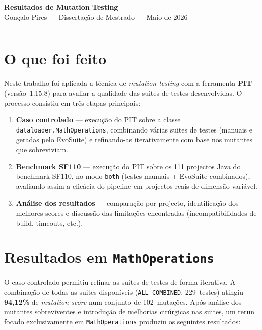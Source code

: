 \documentclass[12pt,a4paper]{article}
\begin{document}

\begin{center}
  {\LARGE\bfseries Resultados de Mutation Testing}\\[0.5em]
  {\large Gonçalo Pires --- Dissertação de Mestrado --- Maio de 2026}
\end{center}

\bigskip
\hrule
\bigskip

\section{O que foi feito}

Neste trabalho foi aplicada a técnica de \textit{mutation testing} com a ferramenta \textbf{PIT}
(versão~1.15.8) para avaliar a qualidade das suites de testes desenvolvidas.
O processo consistiu em três etapas principais:

\begin{enumerate}
  \item \textbf{Caso controlado} --- execução do PIT sobre a classe \texttt{dataloader.MathOperations},
        combinando várias suites de testes (manuais e geradas pelo EvoSuite) e refinando-as
        iterativamente com base nos mutantes que sobreviviam.
  \item \textbf{Benchmark SF110} --- execução do PIT sobre os 111 projectos Java do benchmark
        SF110, no modo \texttt{both} (testes manuais + EvoSuite combinados), avaliando assim
        a eficácia do pipeline em projectos reais de dimensão variável.
  \item \textbf{Análise dos resultados} --- comparação por projecto, identificação dos melhores
        scores e discussão das limitações encontradas (incompatibilidades de build, timeouts, etc.).
\end{enumerate}

\section{Resultados em \texttt{MathOperations}}

O caso controlado permitiu refinar as suites de testes de forma iterativa.
A combinação de todas as suites disponíveis (\texttt{ALL\_COMBINED}, 229~testes) atingiu
\textbf{94,12\%} de \textit{mutation score} num conjunto de 102~mutações.
Após análise dos mutantes sobreviventes e introdução de melhorias cirúrgicas nas suites,
um rerun focado exclusivamente em \texttt{MathOperations} produziu os seguintes resultados:
\end{document}
